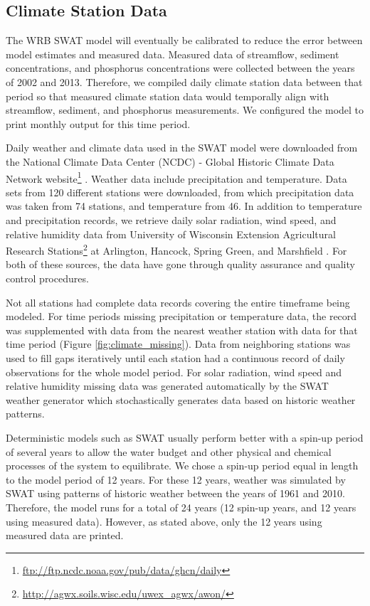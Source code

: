 \subsection{Climate Station Data}\label{sec:climate_data}

The WRB SWAT model will eventually be calibrated to reduce the error between model estimates and measured data. Measured data of streamflow, sediment concentrations, and phosphorus concentrations were collected between the years of 2002 and 2013. Therefore, we compiled daily climate station data between that period so that measured climate station data would temporally align with streamflow, sediment, and phosphorus measurements. We configured the model to print monthly output for this time period. 

Daily weather and climate data used in the SWAT model were downloaded from the National Climate Data Center (NCDC) - Global Historic Climate Data Network website\footnote{\url{ftp://ftp.ncdc.noaa.gov/pub/data/ghcn/daily}} \citep{ncdc_ghcn_2012}. 
Weather data include precipitation and temperature.  
Data sets from 120 different stations were downloaded, from which precipitation data was taken from 74 stations, and temperature from 46. 
In addition to temperature and precipitation records, we retrieve daily solar radiation, wind speed, and relative humidity data from University of Wisconsin Extension Agricultural Research Stations\footnote{\url{http://agwx.soils.wisc.edu/uwex_agwx/awon/}} at Arlington, Hancock, Spring Green, and Marshfield . 
For both of these sources, the data have gone through quality assurance and quality control procedures.

Not all stations had complete data records covering the entire timeframe being modeled.  For time periods missing precipitation or temperature data, the record was supplemented with data from the nearest weather station with data for that time period (Figure \ref{fig:climate_missing}). Data from neighboring stations was used to fill gaps iteratively until each station had a continuous record of daily observations for the whole model period. For solar radiation, wind speed and relative humidity missing data was generated automatically by the SWAT weather generator which stochastically generates data based on historic weather patterns.

Deterministic models such as SWAT usually perform better with a spin-up period of several years to allow the water budget and other physical and chemical processes of the system to equilibrate. We chose a spin-up period equal in length to the model period of 12 years. For these 12 years, weather was simulated by SWAT using patterns of historic weather between the years of 1961 and 2010. Therefore, the model runs for a total of 24 years (12 spin-up years, and 12 years using measured data). However, as stated above, only the 12 years using measured data are printed.
